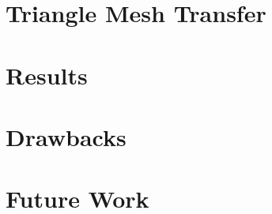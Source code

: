 \documentclass[12pt]{beamer}
\begin{document}
\section{Triangle Mesh Transfer} %
\section{Results} %
\section{Drawbacks} %
\section{Future Work} %


\begin{frame}
  
  
\end{frame}

\end{document}
